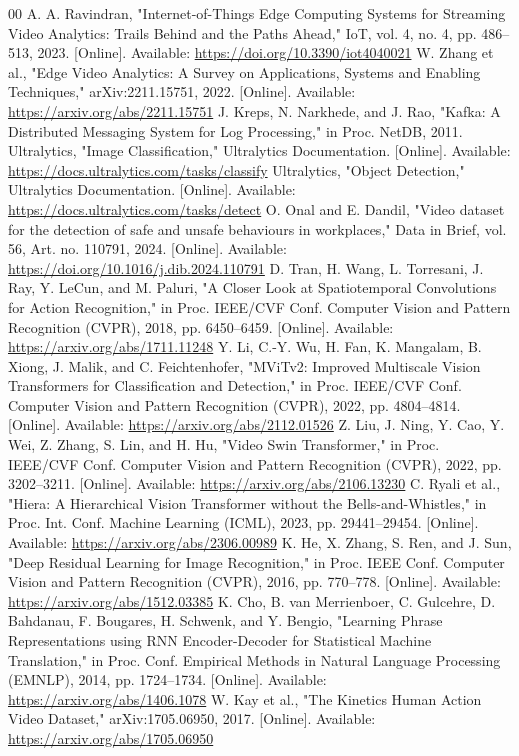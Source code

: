 \documentclass[conference]{IEEEtran}
\begin{document}
\begin{thebibliography}{00}
 A. A. Ravindran, "Internet-of-Things Edge Computing Systems for Streaming Video Analytics: Trails Behind and the Paths Ahead," IoT, vol. 4, no. 4, pp. 486--513, 2023. [Online]. Available: \url{https://doi.org/10.3390/iot4040021}
 W. Zhang et al., "Edge Video Analytics: A Survey on Applications, Systems and Enabling Techniques," arXiv:2211.15751, 2022. [Online]. Available: \url{https://arxiv.org/abs/2211.15751}
 J. Kreps, N. Narkhede, and J. Rao, "Kafka: A Distributed Messaging System for Log Processing," in Proc. NetDB, 2011.
 Ultralytics, "Image Classification," Ultralytics Documentation. [Online]. Available: \url{https://docs.ultralytics.com/tasks/classify}
 Ultralytics, "Object Detection," Ultralytics Documentation. [Online]. Available: \url{https://docs.ultralytics.com/tasks/detect}
 O. Onal and E. Dandil, "Video dataset for the detection of safe and unsafe behaviours in workplaces," Data in Brief, vol. 56, Art. no. 110791, 2024. [Online]. Available: \url{https://doi.org/10.1016/j.dib.2024.110791}
 D. Tran, H. Wang, L. Torresani, J. Ray, Y. LeCun, and M. Paluri, "A Closer Look at Spatiotemporal Convolutions for Action Recognition," in Proc. IEEE/CVF Conf. Computer Vision and Pattern Recognition (CVPR), 2018, pp. 6450--6459. [Online]. Available: \url{https://arxiv.org/abs/1711.11248}
 Y. Li, C.-Y. Wu, H. Fan, K. Mangalam, B. Xiong, J. Malik, and C. Feichtenhofer, "MViTv2: Improved Multiscale Vision Transformers for Classification and Detection," in Proc. IEEE/CVF Conf. Computer Vision and Pattern Recognition (CVPR), 2022, pp. 4804--4814. [Online]. Available: \url{https://arxiv.org/abs/2112.01526}
 Z. Liu, J. Ning, Y. Cao, Y. Wei, Z. Zhang, S. Lin, and H. Hu, "Video Swin Transformer," in Proc. IEEE/CVF Conf. Computer Vision and Pattern Recognition (CVPR), 2022, pp. 3202--3211. [Online]. Available: \url{https://arxiv.org/abs/2106.13230}
 C. Ryali et al., "Hiera: A Hierarchical Vision Transformer without the Bells-and-Whistles," in Proc. Int. Conf. Machine Learning (ICML), 2023, pp. 29441--29454. [Online]. Available: \url{https://arxiv.org/abs/2306.00989}
 K. He, X. Zhang, S. Ren, and J. Sun, "Deep Residual Learning for Image Recognition," in Proc. IEEE Conf. Computer Vision and Pattern Recognition (CVPR), 2016, pp. 770--778. [Online]. Available: \url{https://arxiv.org/abs/1512.03385}
 K. Cho, B. van Merrienboer, C. Gulcehre, D. Bahdanau, F. Bougares, H. Schwenk, and Y. Bengio, "Learning Phrase Representations using RNN Encoder-Decoder for Statistical Machine Translation," in Proc. Conf. Empirical Methods in Natural Language Processing (EMNLP), 2014, pp. 1724--1734. [Online]. Available: \url{https://arxiv.org/abs/1406.1078}
 W. Kay et al., "The Kinetics Human Action Video Dataset," arXiv:1705.06950, 2017. [Online]. Available: \url{https://arxiv.org/abs/1705.06950}


\end{thebibliography}
\end{document}
